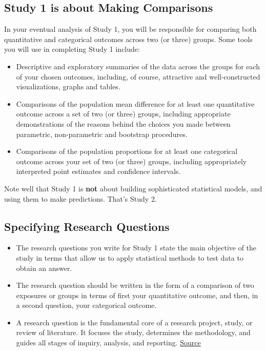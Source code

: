 \documentclass[]{book}
\providecommand{\tightlist}{%
  \setlength{\itemsep}{0pt}\setlength{\parskip}{0pt}}
\theoremstyle{definition}
\theoremstyle{definition}
\theoremstyle{definition}
\theoremstyle{remark}
\begin{document}
\hypertarget{study-1-is-about-making-comparisons}{%
\subsection{Study 1 is about Making
Comparisons}\label{study-1-is-about-making-comparisons}}

In your eventual analysis of Study 1, you will be responsible for
comparing both quantitative and categorical outcomes across two (or
three) groups. Some tools you will use in completing Study 1 include:

\begin{itemize}
\tightlist
\item
  Descriptive and exploratory summaries of the data across the groups
  for each of your chosen outcomes, including, of course, attractive and
  well-constructed visualizations, graphs and tables.
\item
  Comparisons of the population mean difference for at least one
  quantitative outcome across a set of two (or three) groups, including
  appropriate demonstrations of the reasons behind the choices you made
  between parametric, non-parametric and bootstrap procedures.
\item
  Comparisons of the population proportions for at least one categorical
  outcome across your set of two (or three) groups, including
  appropriately interpreted point estimates and confidence intervals.
\end{itemize}

Note well that Study 1 is \textbf{not} about building sophisticated
statistical models, and using them to make predictions. That's Study 2.

\hypertarget{specifying-research-questions}{%
\subsection{Specifying Research
Questions}\label{specifying-research-questions}}

\begin{itemize}
\tightlist
\item
  The research questions you write for Study 1 state the main objective
  of the study in terms that allow us to apply statistical methods to
  test data to obtain an answer.
\item
  The research question should be written in the form of a comparison of
  two exposures or groups in terms of first your quantitative outcome,
  and then, in a second question, your categorical outcome.
\item
  A research question is the fundamental core of a research project,
  study, or review of literature. It focuses the study, determines the
  methodology, and guides all stages of inquiry, analysis, and
  reporting.
  \href{https://researchrundowns.com/intro/writing-research-questions/}{Source}
\end{itemize}
\end{document}
